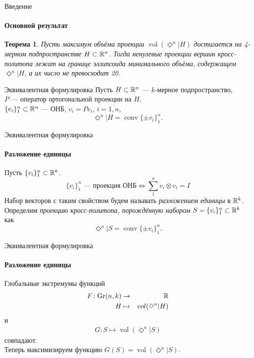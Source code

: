 \documentclass{beamer}
\def\vol{\mathop{vol}}
\def\co{\mathop{conv}}
\def\Gr{\text{Gr}}
\newtheorem{thrm}{Теорема}
\newcommand{\crosp}{\Diamond}
\begin{document}
\begin{frame}{Введение}
	\framesubtitle{Основной результат}
	\begin{thrm}
		Пусть максимум объёма проекции $\vol(\crosp^n|H)$ достигается на 4-мерном подпространстве $H\subset\mathbb {R}^n$. Тогда ненулевые проекции вершин кросс-политопа лежат на границе эллипсоида минимального объёма, содержащем $\crosp^n|H$, а их число не превосходит 20.
	\end{thrm}
\end{frame}

\begin{frame}{Эквивалентная формулировка}
	Пусть $H\subset\mathbb {R}^n$ --- $k$-мерное подпространство,\\\pause
	$P$ --- оператор ортогональной проекции на $H$,\\\pause
	$\{e_i\}_1^n\subset\mathbb {R}^n$ --- ОНБ, \pause $v_i=Pe_i$, $i=\overline{1,n}$,\pause
		$$\crosp^n|H=\co\{\pm v_i\}_1^n.$$
\end{frame}

\begin{frame}{Эквивалентная формулировка}
	\framesubtitle{Разложение единицы}
	Пусть $\{v_i\}_1^n\subset\mathbb {R}^k$.\pause
	\begin{equation*}
		\{v_i\}_1^n\text{ --- проекция ОНБ}\Leftrightarrow\sum_1^n v_i\otimes v_i=I
	\end{equation*}\pause
	Набор векторов с таким свойством будем называть \textit{разложением единицы} в $\mathbb {R}^k$.\\\pause
	Определим \textit{проекцию кросс-политопа, порождённую набором} $S=\{v_i\}_1^n\subset\mathbb {R}^k$ как
		$$\crosp^n|S=\co\{\pm v_i\}_1^n.$$
\end{frame}

\begin{frame}{Эквивалентная формулировка}
	\framesubtitle{Разложение единицы}
	Глобальные экстремумы функций
	\begin{eqnarray*}
		F\colon\Gr(n,k)&\to&\RR\\
		H&\mapsto&\vol(\crosp^n|H)
	\end{eqnarray*}
	и
	\begin{eqnarray*}
		G\colon S\mapsto\vol(\crosp^n|S)
	\end{eqnarray*}
	совпадают.\\\pause
	Теперь максимизируем функцию $G(S)=\vol(\crosp^n|S)$.
\end{frame}
\end{document}
